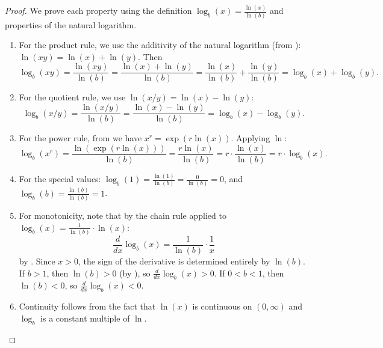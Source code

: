 \begin{proof}
    We prove each property using the definition $\log_b(x) = \frac{\ln(x)}{\ln(b)}$ and properties of the natural logarithm.

    \begin{enumerate}
        \item For the product rule, we use the additivity of the natural logarithm (from ): $\ln(xy) = \ln(x) + \ln(y)$. Then
        $$\log_b(xy) = \frac{\ln(xy)}{\ln(b)} = \frac{\ln(x) + \ln(y)}{\ln(b)} = \frac{\ln(x)}{\ln(b)} + \frac{\ln(y)}{\ln(b)} = \log_b(x) + \log_b(y).$$

        \item For the quotient rule, we use $\ln(x/y) = \ln(x) - \ln(y)$:
        $$\log_b(x/y) = \frac{\ln(x/y)}{\ln(b)} = \frac{\ln(x) - \ln(y)}{\ln(b)} = \log_b(x) - \log_b(y).$$

        \item For the power rule, from  we have $x^r = \exp(r \ln(x))$. Applying $\ln$:
        $$\log_b(x^r) = \frac{\ln(\exp(r \ln(x)))}{\ln(b)} = \frac{r \ln(x)}{\ln(b)} = r \cdot \frac{\ln(x)}{\ln(b)} = r \cdot \log_b(x).$$

        \item For the special values: $\log_b(1) = \frac{\ln(1)}{\ln(b)} = \frac{0}{\ln(b)} = 0$, and $\log_b(b) = \frac{\ln(b)}{\ln(b)} = 1$.

        \item For monotonicity, note that by the chain rule applied to $\log_b(x) = \frac{1}{\ln(b)} \cdot \ln(x)$:
        $$\frac{d}{dx} \log_b(x) = \frac{1}{\ln(b)} \cdot \frac{1}{x}$$
        by . Since $x > 0$, the sign of the derivative is determined entirely by $\ln(b)$. If $b > 1$, then $\ln(b) > 0$ (by ), so $\frac{d}{dx} \log_b(x) > 0$. If $0 < b < 1$, then $\ln(b) < 0$, so $\frac{d}{dx} \log_b(x) < 0$.

        \item Continuity follows from the fact that $\ln(x)$ is continuous on $(0, \infty)$ and $\log_b$ is a constant multiple of $\ln$.
    \end{enumerate}
\end{proof}
